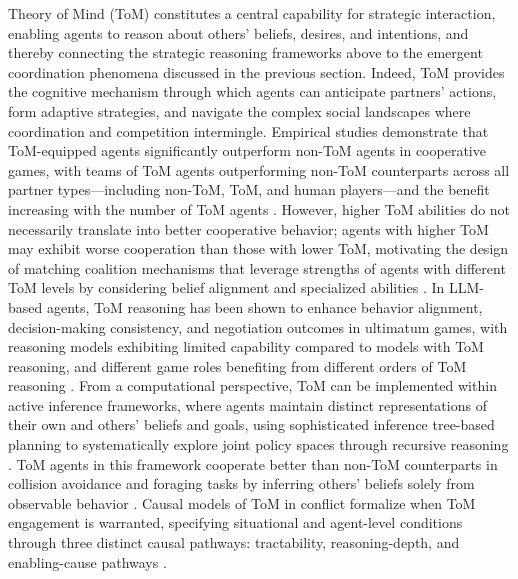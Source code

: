 \documentclass[11pt]{article}
\begin{document}
Theory of Mind (ToM) constitutes a central capability for strategic interaction, enabling agents to reason about others' beliefs, desires, and intentions, and thereby connecting the strategic reasoning frameworks above to the emergent coordination phenomena discussed in the previous section. Indeed, ToM provides the cognitive mechanism through which agents can anticipate partners' actions, form adaptive strategies, and navigate the complex social landscapes where coordination and competition intermingle. Empirical studies demonstrate that ToM-equipped agents significantly outperform non-ToM agents in cooperative games, with teams of ToM agents outperforming non-ToM counterparts across all partner types---including non-ToM, ToM, and human players---and the benefit increasing with the number of ToM agents \cite{ref228}. However, higher ToM abilities do not necessarily translate into better cooperative behavior; agents with higher ToM may exhibit worse cooperation than those with lower ToM, motivating the design of matching coalition mechanisms that leverage strengths of agents with different ToM levels by considering belief alignment and specialized abilities \cite{ref229}. In LLM-based agents, ToM reasoning has been shown to enhance behavior alignment, decision-making consistency, and negotiation outcomes in ultimatum games, with reasoning models exhibiting limited capability compared to models with ToM reasoning, and different game roles benefiting from different orders of ToM reasoning \cite{ref230}. From a computational perspective, ToM can be implemented within active inference frameworks, where agents maintain distinct representations of their own and others' beliefs and goals, using sophisticated inference tree-based planning to systematically explore joint policy spaces through recursive reasoning \cite{ref231}. ToM agents in this framework cooperate better than non-ToM counterparts in collision avoidance and foraging tasks by inferring others' beliefs solely from observable behavior \cite{ref231}. Causal models of ToM in conflict formalize when ToM engagement is warranted, specifying situational and agent-level conditions through three distinct causal pathways: tractability, reasoning-depth, and enabling-cause pathways \cite{ref232}.
\end{document}
